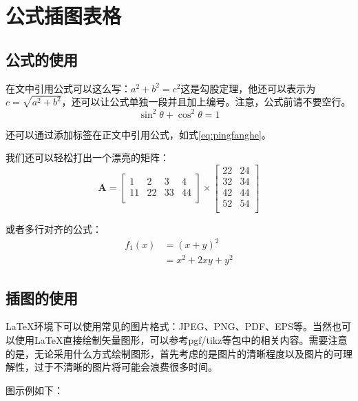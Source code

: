 
\chapter{公式插图表格}

\section{公式的使用}
在文中引用公式可以这么写：$a^2+b^2=c^2$这是勾股定理，他还可以表示为$c=\sqrt{a^2+b^2}$，还可以让公式单独一段并且加上编号。注意，公式前请不要空行。
\begin{equation}
\sin^2{\theta}+\cos^2{\theta}=1 \label{eq:pingfanghe}
\end{equation}

还可以通过添加标签在正文中引用公式，如式\eqref{eq:pingfanghe}。

我们还可以轻松打出一个漂亮的矩阵：
\begin{equation}
  \mathbf{A}=
  \left[\begin{matrix}
    1&2&3&4\\
    11&22&33&44\\
  \end{matrix}\right] \times
  \left[\begin{matrix}
    22&24\\
    32&34\\
    42&44\\
    52&54\\
  \end{matrix}\right]
\end{equation}

或者多行对齐的公式：
\begin{equation}
  \begin{aligned}
    f_1(x)&=(x+y)^2\\
          &=x^2+2xy+y^2
  \end{aligned}
\end{equation}


\section{插图的使用}

\LaTeX 环境下可以使用常见的图片格式：JPEG、PNG、PDF、EPS等。当然也可以使用\LaTeX 直接绘制矢量图形，可以参考pgf/tikz等包中的相关内容。需要注意的是，无论采用什么方式绘制图形，首先考虑的是图片的清晰程度以及图片的可理解性，过于不清晰的图片将可能会浪费很多时间。

图示例如下：

